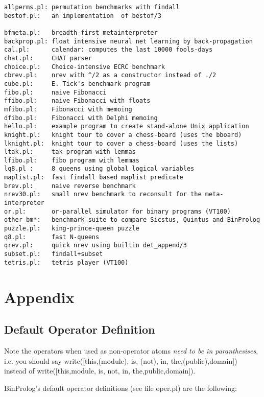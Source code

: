 \documentclass{article}
\begin{document}
{\small
\begin{verbatim}
allperms.pl: permutation benchmarks with findall
bestof.pl:   an implementation  of bestof/3

bfmeta.pl:   breadth-first metainterpreter
backprop.pl: float intensive neural net learning by back-propagation
cal.pl:      calendar: computes the last 10000 fools-days
chat.pl:     CHAT parser
choice.pl:   Choice-intensive ECRC benchmark
cbrev.pl:    nrev with ^/2 as a constructor instead of ./2
cube.pl:     E. Tick's benchmark program
fibo.pl:     naive Fibonacci
ffibo.pl:    naive Fibonacci with floats
mfibo.pl:    Fibonacci with memoing
dfibo.pl:    Fibonacci with Delphi memoing
hello.pl:    example program to create stand-alone Unix application
knight.pl:   knight tour to cover a chess-board (uses the bboard)
lknight.pl:  knight tour to cover a chess-board (uses the lists)
ltak.pl:     tak program with lemmas
lfibo.pl:    fibo program with lemmas
lq8.pl :     8 queens using global logical variables
maplist.pl:  fast findall based maplist predicate
brev.pl:     naive reverse benchmark
nrev30.pl:   small nrev benchmark to reconsult for the meta-interpreter
or.pl:       or-parallel simulator for binary programs (VT100)
other_bm*:   benchmark suite to compare Sicstus, Quintus and BinProlog
puzzle.pl:   king-prince-queen puzzle
q8.pl:       fast N-queens
qrev.pl:     quick nrev using builtin det_append/3
subset.pl:   findall+subset
tetris.pl:   tetris player (VT100)
\end{verbatim}
}


\section{Appendix}

\subsection{Default Operator Definition}

Note the operators when used as non-operator atoms {\em need to be in paranthesises}, i.e. you should say write([this,(module), is, (not), in, the,(public),domain]) instead of write([this,module, is, not, in, the,public,domain]).

BinProlog's default operator definitions
(see file oper.pl) are the following:
\end{document}
